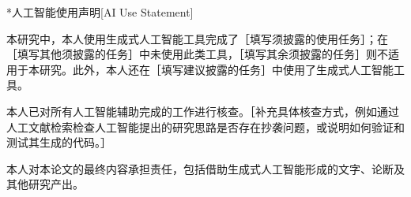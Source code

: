 \makeatletter
\ifhitsz@openright\cleardoublepage\else\clearpage\fi
{}[AI Use Statement]
\makeatother

本研究中，本人使用生成式人工智能工具完成了［填写须披露的使用任务］；在［填写其他须披露的任务］中未使用此类工具，［填写其余须披露的任务］则不适用于本研究。此外，本人还在［填写建议披露的任务］中使用了生成式人工智能工具。

本人已对所有人工智能辅助完成的工作进行核查。［补充具体核查方式，例如通过人工文献检索检查人工智能提出的研究思路是否存在抄袭问题，或说明如何验证和测试其生成的代码。］

本人对本论文的最终内容承担责任，包括借助生成式人工智能形成的文字、论断及其他研究产出。
